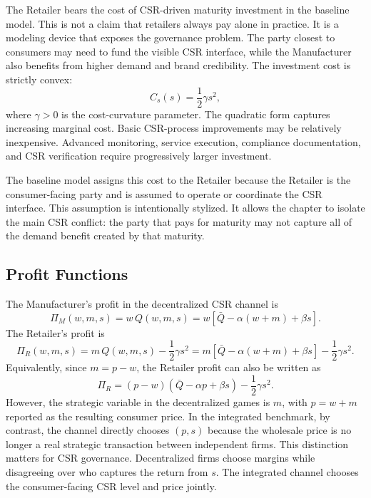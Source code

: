 The Retailer bears the cost of CSR-driven maturity investment in the baseline model. This is not a claim that retailers always pay alone in practice. It is a modeling device that exposes the governance problem. The party closest to consumers may need to fund the visible CSR interface, while the Manufacturer also benefits from higher demand and brand credibility. The investment cost is strictly convex:
\begin{equation*}
    C_s(s)=\frac{1}{2}\gamma s^2,
\end{equation*}
where $\gamma>0$ is the cost-curvature parameter. The quadratic form captures increasing marginal cost. Basic CSR-process improvements may be relatively inexpensive. Advanced monitoring, service execution, compliance documentation, and CSR verification require progressively larger investment.

The baseline model assigns this cost to the Retailer because the Retailer is the consumer-facing party and is assumed to operate or coordinate the CSR interface. This assumption is intentionally stylized. It allows the chapter to isolate the main CSR conflict: the party that pays for maturity may not capture all of the demand benefit created by that maturity.

\subsection{Profit Functions}

The Manufacturer's profit in the decentralized CSR channel is
\begin{equation}
    \Pi_M(w,m,s)=w\,Q(w,m,s)=w\left[\bar{Q}-\alpha(w+m)+\beta s\right].
    \label{eq:pi_M_markup}
\end{equation}
The Retailer's profit is
\begin{equation}
    \Pi_R(w,m,s)=m\,Q(w,m,s)-\frac{1}{2}\gamma s^2
    =m\left[\bar{Q}-\alpha(w+m)+\beta s\right]-\frac{1}{2}\gamma s^2.
    \label{eq:pi_R_markup}
\end{equation}
Equivalently, since $m=p-w$, the Retailer profit can also be written as
\begin{equation*}
    \Pi_R=(p-w)\left(\bar{Q}-\alpha p+\beta s\right)-\frac{1}{2}\gamma s^2.
\end{equation*}
However, the strategic variable in the decentralized games is $m$, with $p=w+m$ reported as the resulting consumer price. In the integrated benchmark, by contrast, the channel directly chooses $(p,s)$ because the wholesale price is no longer a real strategic transaction between independent firms. This distinction matters for CSR governance. Decentralized firms choose margins while disagreeing over who captures the return from $s$. The integrated channel chooses the consumer-facing CSR level and price jointly.

